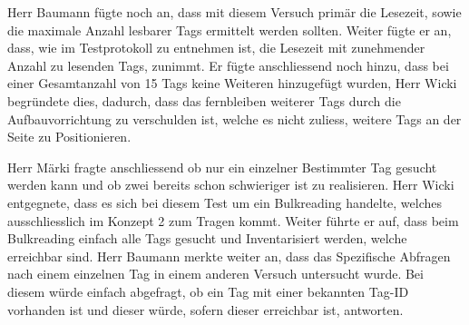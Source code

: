\documentclass[parskip=full, a4paper]{scrreprt}
\begin{document}
Herr Baumann fügte noch an, dass mit diesem Versuch primär die Lesezeit, sowie die maximale Anzahl lesbarer Tags ermittelt werden sollten. Weiter fügte er an, dass, wie im Testprotokoll zu entnehmen ist, die Lesezeit mit zunehmender Anzahl zu lesenden Tags, zunimmt. Er fügte anschliessend noch hinzu, dass bei einer Gesamtanzahl von 15 Tags keine Weiteren hinzugefügt wurden, Herr Wicki begründete dies, dadurch, dass das fernbleiben weiterer Tags durch die Aufbauvorrichtung zu verschulden ist, welche es nicht zuliess, weitere Tags an der Seite zu Positionieren.

Herr Märki fragte anschliessend ob nur ein einzelner Bestimmter Tag gesucht werden kann und ob zwei bereits schon schwieriger ist zu realisieren. Herr Wicki entgegnete, dass es sich bei diesem Test um ein Bulkreading handelte, welches ausschliesslich im Konzept 2 zum Tragen kommt. Weiter führte er auf, dass beim Bulkreading einfach alle Tags gesucht und Inventarisiert werden, welche erreichbar sind.
Herr Baumann merkte weiter an, dass das Spezifische Abfragen nach einem einzelnen Tag in einem anderen Versuch untersucht wurde. Bei diesem würde einfach abgefragt, ob ein Tag mit einer bekannten Tag-ID vorhanden ist und dieser würde, sofern dieser erreichbar ist, antworten.
\end{document}
